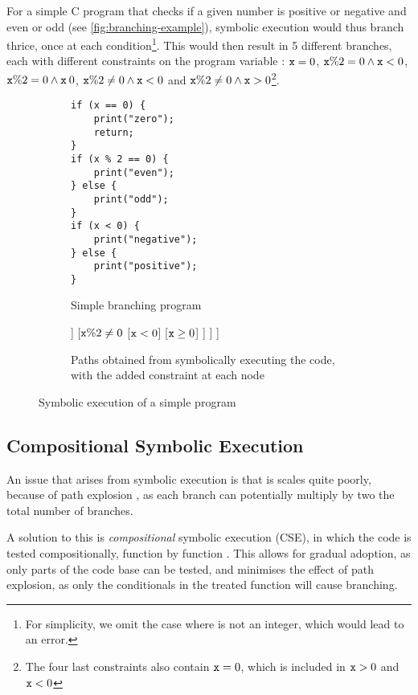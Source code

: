 For a simple C program that checks if a given number is positive or negative and even or odd (see \autoref{fig:branching-example}), symbolic execution would thus branch thrice, once at each condition\footnote{For simplicity, we omit the case where  is not an integer, which would lead to an error.}. This would then result in 5 different branches, each with different constraints on the program variable : $\code{x} = 0$, $\texttt{x}\%2=0 \land \texttt{x}<0$, $\texttt{x}\%2=0 \land \texttt{x}\>0$, $\texttt{x}\%2\neq0 \land \texttt{x}<0$ and $\texttt{x}\%2\neq0 \land \texttt{x}>0$\footnote{The four last constraints also contain $\code{x} = 0$, which is included in $\texttt{x}>0$ and $\code{x}<0$}.

\begin{figure}[h]
\centering
\begin{subfigure}{.5\textwidth}
	\centering
	\begin{verbatim}
if (x == 0) {
	print("zero");
	return;
}
if (x % 2 == 0) {
	print("even");
} else {
	print("odd");
}
if (x < 0) {
	print("negative");
} else {
	print("positive");
}
	\end{verbatim}
	\caption{Simple branching program}
\end{subfigure}%
\begin{subfigure}{.5\textwidth}
\centering
\begin{forest} 
[{$\top$}
	[{$\code{x} = 0$}]
	[{$\code{x}\neq 0$}
		[{$\code{x}\%2=0$}
			[{$\code{x} < 0$}]	
			[{$\code{x} \geq 0$}]	
		]
		[{$\texttt{x}\%2\neq0$}
			[{$\code{x} < 0$}]	
			[{$\code{x} \geq 0$}]	
		]
	]
]	
\end{forest}
\caption{Paths obtained from symbolically executing the code, with the added constraint at each node}
\end{subfigure}
	
\caption{Symbolic execution of a simple program}
	\label{fig:branching-example}
\end{figure}

\subsection{Compositional Symbolic Execution}

An issue that arises from symbolic execution is that is scales quite poorly, because of path explosion \cite{pathexplo,surveysymex}, as each branch can potentially multiply by two the total number of branches.

A solution to this is \emph{compositional} symbolic execution (CSE), in which the code is tested compositionally, function by function \cite{compositionalsymtesting}. This allows for gradual adoption, as only parts of the code base can be tested, and minimises the effect of path explosion, as only the conditionals in the treated function will cause branching.

